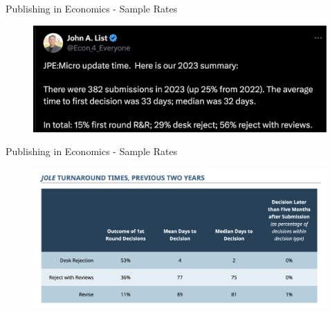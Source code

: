 \documentclass{beamer}
\begin{document}
\begin{frame}{Publishing in Economics - Sample Rates}
    \begin{figure}
        \includegraphics[scale=0.45]{images/jpe_micro.png}
    \end{figure}      
\end{frame}

\begin{frame}{Publishing in Economics - Sample Rates}
    \begin{figure}
        \includegraphics[scale=0.55]{images/jole.png}
    \end{figure}      
\end{frame}
\end{document}
